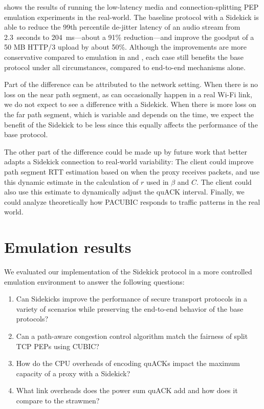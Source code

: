  shows the results of running the low-latency
media and connection-splitting PEP emulation experiments in the real-world.
The baseline protocol with a Sidekick is able to
reduce the 99th percentile de-jitter latency of an audio stream
from 2.3~seconds to 204~ms---about a 91\% reduction---and
improve the goodput of a 50 MB HTTP/3 upload by about 50\%.
Although the improvements are more conservative compared to emulation in
 and
, each case still benefits the
base protocol under all circumstances, compared to end-to-end mechanisms alone.

Part of the difference can be attributed to the network setting. When there is
no loss on the near path segment, as can occasionally happen in a real Wi-Fi
link, we do not expect to see a difference with a Sidekick. When there is more
loss on the far path segment, which is variable and depends on the time, we
expect the benefit of the Sidekick to be less since this equally affects the
performance of the base protocol.

The other part of the difference could be made up by future work that better
adapts a Sidekick connection to real-world variability: The client could
improve path segment RTT estimation based on when the proxy receives packets,
and use this dynamic estimate in the calculation of $r$ used in $\beta$ and
$C$. The client could also use this estimate to dynamically adjust the quACK
interval. Finally, we could analyze theoretically how PACUBIC responds to
traffic patterns in the real world.

\section{Emulation results}
\label{sec:sidekick:emulation}



We evaluated our implementation of the Sidekick protocol in a more controlled
emulation environment to answer the following questions:
\begin{enumerate}[noitemsep,topsep=0pt]
	\item Can Sidekicks improve the performance of secure transport protocols
	in a variety of scenarios while preserving the end-to-end behavior of the
	base protocols?
	\item Can a path-aware congestion control algorithm match the fairness of
	split TCP PEPs using CUBIC?
	\item How do the CPU overheads of encoding quACKs impact the maximum
	capacity of a proxy with a Sidekick?
	\item What link overheads does the power sum quACK add and how does it
	compare to the strawmen?
\end{enumerate}

